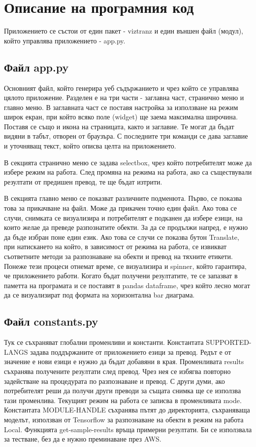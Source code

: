 \documentclass[12pt]{article}
\begin{document}
\section{Описание на програмния код}

Приложението се състои от един пакет - viztranz и един външен файл (модул), който управлява приложението - app.py.

\subsection{Файл app.py}

\noindent Основният файл, който генерира уеб съдържанието и чрез който се управлява цялото приложение. Разделен е на три части - заглавна част, странично меню и главно меню. В заглавната част се поставя настройка за използване на режим широк екран, при който всяко поле (widget) ще заема максимална широчина. Поставя се също и икона на страницата, както и заглавие. Те могат да бъдат видяни в табът, отворен от браузъра. С последните три команди се дава заглавие и уточняващ текст, който описва целта на приложението.

\noindent В секцията странично меню се задава selectbox, чрез който потребителят може да избере режим на работа. След промяна на режима на работа, ако са съществували резултати от предишен превод, те ще бъдат изтрити.

\noindent В секцията главно меню се показват различните подменюта. Първо, се показва това за прикачване на файл. Може да прикачен точно един файл. Ако това се случи, снимката се визуализира и потребителят е подканен да избере езици, на които желае да преведе разпознатите обекти. За да се продължи напред, е нужно да бъде избран поне един език. Ако това се случи се показва бутон Translate, при натискането на който, в зависимост от режима на работа, се извикват съответните методи за разпознаване на обекти и превод на тяхните етикети. Понеже тези процеси отнемат време, се визуализира и spinner, който гарантира, че приложението работи. Когато бъдат получени резултатите, те се запазват в паметта на програмата и се поставят в pandas dataframe, чрез който лесно могат да се визуализират под формата на хоризонтална bar диаграма. 

\subsection{Файл constants.py}

\noindent Тук се съхраняват глобални променливи и константи. Константата SUPPORTED-LANGS задава поддържаните от приложението езици за превод. Редът е от значение е нови езици е нужно да бъдат добавяни в края. Променливата results съхранява получените резултати след превод. Чрез нея се избягва повторно задействане на процедурата по разпознаване и превод. С други думи, ако потребителят реши да получи други преводи за същата снимка ще се използва тази променлива. Текущият режим на работа се записва в променливата mode. Константата MODULE-HANDLE съхранява пътят до директорията, съхраняваща моделът, използван от Tensorflow за разпознаване на обекти в режим на работа Local. Функцията get-sample-results връща примерни резултати. Би се използвала за тестване, без да е нужно преминаване през AWS.
\end{document}
